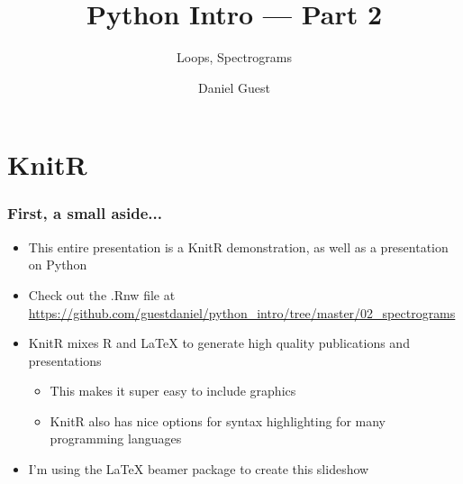 \documentclass{beamer}\usepackage[]{graphicx}\usepackage[]{color}
\title{Python Intro --- Part 2}
\subtitle{Loops, Spectrograms}
\author{Daniel Guest}
\begin{document}
\maketitle

\tableofcontents

\section{KnitR}

\begin{frame}[fragile]
\frametitle{First, a small aside...}
\begin{itemize}
	\item This entire presentation is a KnitR demonstration, as well as a presentation on Python

	\item Check out the .Rnw file at \url{https://github.com/guestdaniel/python\_intro/tree/master/02\_spectrograms}

	\item KnitR mixes R and \LaTeX{} to generate high quality publications and presentations

		\begin{itemize}
			\item This makes it super easy to include graphics

			\item KnitR also has nice options for syntax highlighting for many programming languages 

		\end{itemize}
	
	\item I'm using the \LaTeX{} beamer package to create this slideshow

\end{itemize}
\end{frame}
\end{document}
